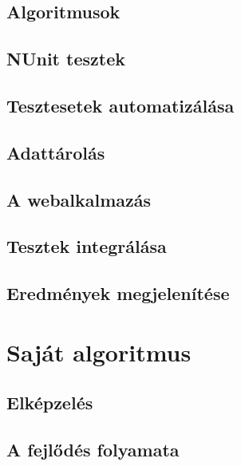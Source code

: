 \documentclass[12pt]{report} %
\begin{document}
\section{Algoritmusok} %

\section{NUnit tesztek} %

\section{Tesztesetek automatizálása} %

\section{Adattárolás} %

\section{A webalkalmazás} %

\section{Tesztek integrálása} %

\section{Eredmények megjelenítése} %

\chapter{Saját algoritmus} %

\section{Elképzelés} %

\section{A fejlődés folyamata} %
\end{document}
